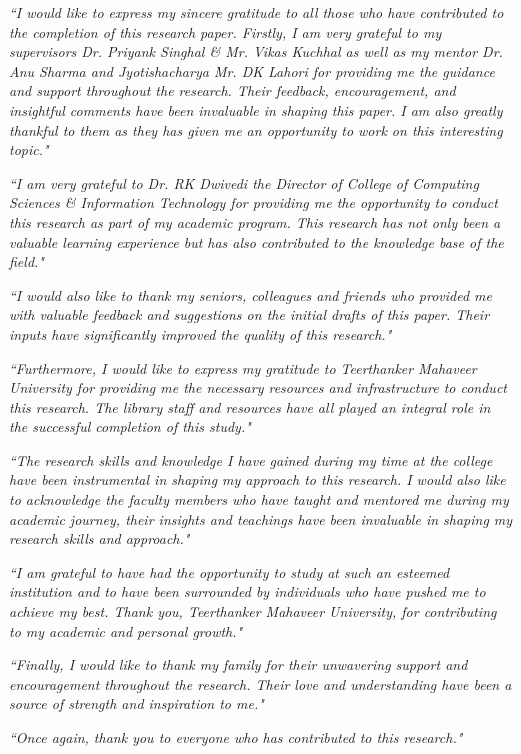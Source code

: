 \textit{``I would like to express my sincere gratitude to all those who have contributed to the completion of this research paper. Firstly, I am very grateful to my supervisors Dr. Priyank Singhal \& Mr. Vikas Kuchhal as well as my mentor Dr. Anu Sharma and Jyotishacharya Mr. DK Lahori for providing me the guidance and support throughout the research. Their feedback, encouragement, and insightful comments have been invaluable in shaping this paper. I am also greatly thankful to them as they has given me an opportunity to work on this interesting topic."}

\textit{``I am very grateful to Dr. RK Dwivedi the Director of College of Computing Sciences \& Information Technology for providing me the opportunity to conduct this research as part of my academic program. This research has not only been a valuable learning experience but has also contributed to the knowledge base of the field."}

\textit{``I would also like to thank my seniors, colleagues and friends who provided me with valuable feedback and suggestions on the initial drafts of this paper. Their inputs have significantly improved the quality of this research."}

\textit{``Furthermore, I would like to express my gratitude to Teerthanker Mahaveer University for providing me the necessary resources and infrastructure to conduct this research. The library staff and resources have all played an integral role in the successful completion of this study."}

\textit{``The research skills and knowledge I have gained during my time at the college have been instrumental in shaping my approach to this research. I would also like to acknowledge the faculty members who have taught and mentored me during my academic journey, their insights and teachings have been invaluable in shaping my research skills and approach."}

\textit{``I am grateful to have had the opportunity to study at such an esteemed institution and to have been surrounded by individuals who have pushed me to achieve my best. Thank you, Teerthanker Mahaveer University, for contributing to my academic and personal growth."}

\textit{``Finally, I would like to thank my family for their unwavering support and encouragement throughout the research. Their love and understanding have been a source of strength and inspiration to me."}

\textit{``Once again, thank you to everyone who has contributed to this research."}
